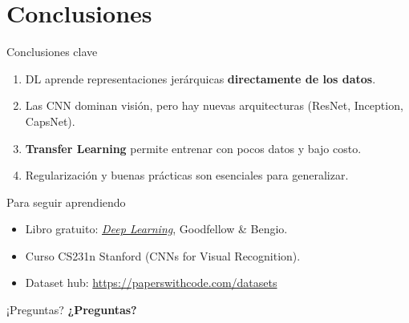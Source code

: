 \documentclass[8pt,spanish]{beamer}
\begin{document}
\section{Conclusiones}
\begin{frame}{Conclusiones clave}
  \begin{enumerate}
    \item DL aprende representaciones jerárquicas \textbf{directamente de los datos}.
    \item Las CNN dominan visión, pero hay nuevas arquitecturas (ResNet, Inception, CapsNet).
    \item \textbf{Transfer Learning} permite entrenar con pocos datos y bajo costo.
    \item Regularización y buenas prácticas son esenciales para generalizar.
  \end{enumerate}
\end{frame}

\begin{frame}{Para seguir aprendiendo}
  \begin{itemize}
    \item Libro gratuito: \href{https://www.deeplearningbook.org}{\emph{Deep Learning}}, Goodfellow \& Bengio.
    \item Curso CS231n Stanford (CNNs for Visual Recognition).
    \item Dataset hub: \url{https://paperswithcode.com/datasets}
  \end{itemize}
\end{frame}

\begin{frame}{¡Preguntas?}
  \centering
  \Huge \textbf{¿Preguntas?}
\end{frame}
\end{document}
